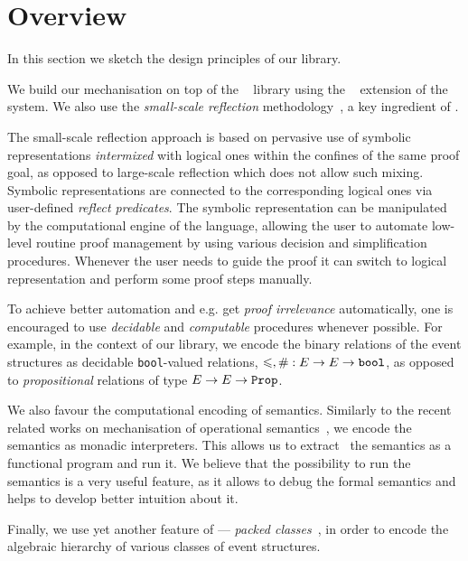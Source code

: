 \section{Overview}

In this section we sketch the design principles of our library. 

We build our mechanisation on top of the \mathcomp~\cite{Mahboubi-Tassi:MATHCOMP17} library 
using the \ssreflect~\cite{Gonthier-al:SSR2016} extension of the \coq system.
We also use the \emph{small-scale reflection} 
methodology~\cite{Gonthier-Assia:SSR2010, Gonthier-al:SSR2016}, 
a key ingredient of \ssreflect. 

The small-scale reflection approach is based on 
pervasive use of symbolic representations \emph{intermixed}
with logical ones within the confines of the same proof goal,
as opposed to large-scale reflection which does not allow such mixing.
Symbolic representations are connected to the corresponding logical ones
via user-defined \emph{reflect predicates}.
The symbolic representation can be manipulated 
by the computational engine of the language, 
allowing the user to automate low-level routine 
proof management by using various decision 
and simplification procedures.
Whenever the user needs to guide the proof 
it can switch to logical representation
and perform some proof steps manually. 

To achieve better automation and e.g. get \emph{proof irrelevance}
automatically, one is encouraged
to use \emph{decidable} and \emph{computable} procedures
whenever possible.
For example, in the context of our library, 
we encode the binary relations of the event structures
as decidable \texttt{bool}-valued relations, 
\ie $\leqslant, \# : E \rightarrow E \rightarrow \texttt{bool}$,
as opposed to \emph{propositional} 
relations of type $E \rightarrow E \rightarrow \texttt{Prop}$. 

We also favour the computational encoding of semantics. 
Similarly to the recent related works on mechanisation 
of operational semantics~\cite{Xia-al:POPL2019, Letan-al:CPP2020, Affeldt-al:ICMPC2019}, 
we encode the semantics as monadic interpreters.  
This allows us to extract~\cite{Letouzey:CCE2008} 
the semantics as a functional program and run it. 
We believe that the possibility to run the semantics 
is a very useful feature, as it allows 
to debug the formal semantics
and helps to develop better intuition about it.

Finally, we use yet another feature of \mathcomp --- 
\emph{packed classes}~\cite{Garillot-al:ICTPHOL2009}, 
in order to encode the algebraic hierarchy
of various classes of event structures. 

